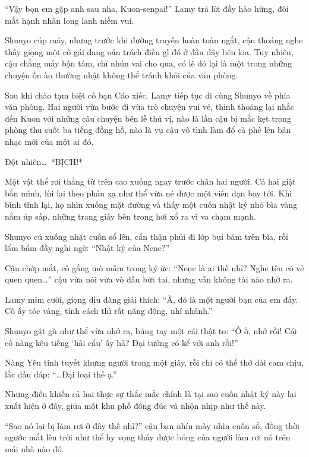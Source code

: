 \documentclass[../main.tex]{subfiles}
\begin{document}
``Vậy bọn em gặp anh sau nha, Kuon-senpai!'' Lamy trả lời đầy hào hứng, đôi mắt hạnh nhân long lanh niềm vui.

Shunyo cúp máy, nhưng trước khi đường truyền hoàn toàn ngắt, cậu thoáng nghe thấy giọng một cô gái đang oán trách điều gì đó ở đầu dây bên kia. Tuy nhiên, cậu chẳng mấy bận tâm, chỉ nhún vai cho qua, có lẽ đó lại là một trong những chuyện ồn ào thường nhật không thể tránh khỏi của văn phòng.

Sau khi chào tạm biệt cô bạn Cáo xiếc, Lamy tiếp tục đi cùng Shunyo về phía văn phòng. Hai người vừa bước đi vừa trò chuyện vui vẻ, thỉnh thoảng lại nhắc đến Kuon với những câu chuyện bên lề thú vị, nào là lần cậu bị mắc kẹt trong phòng thu suốt ba tiếng đồng hồ, nào là vụ cậu vô tình làm đổ cà phê lên bản nhạc mới của một ai đó.

Đột nhiên\dots\ *BỊCH!*

Một vật thể rơi thẳng từ trên cao xuống ngay trước chân hai người. Cả hai giật bắn mình, lùi lại theo phản xạ như thể vừa né được một viên đạn bay tới. Khi bình tĩnh lại, họ nhìn xuống mặt đường và thấy một cuốn nhật ký nhỏ bìa vàng nằm úp sấp, những trang giấy bên trong hơi xổ ra vì va chạm mạnh.


Shunyo cú xuống nhặt cuốn sổ lên, cẩn thận phủi đi lớp bụi bám trên bìa, rồi lẩm bẩm đầy nghi ngờ: ``Nhật ký của Nene?''

Cậu chớp mắt, cố gắng mò mẫm trong ký ức: ``Nene là ai thế nhỉ? Nghe tên có vẻ quen quen\dots'' cậu vừa nói vừa vò đầu bứt tai, nhưng vẫn không tài nào nhớ ra.

Lamy mỉm cười, giọng dịu dàng giải thích: ``À, đó là một người bạn của em đấy. Cô ấy tóc vàng, tính cách thì rất năng động, nhí nhảnh.''

Shunyo gật gù như thể vừa nhớ ra, búng tay một cái thật to: ``Ồ ồ, nhớ rồi! Cái cô nàng kêu tiếng `hải cẩu' ấy hả? Đại tướng có kể với anh rồi!''

Nàng Yêu tinh tuyết khựng người trong một giây, rồi chỉ có thể thở dài cam chịu, lắc đầu đáp: ``\dots Đại loại thế ạ.''

Nhưng điều khiến cả hai thực sự thắc mắc chính là tại sao cuốn nhật ký này lại xuất hiện ở đây, giữa một khu phố đông đúc và nhộn nhịp như thế này.

``Sao nó lại bị làm rơi ở đây thế nhỉ?'' cậu bạn nhíu mày nhìn cuốn sổ, đồng thời ngước mắt lên trời như thể hy vọng thấy được bóng của người làm rơi nó trên mái nhà nào đó.
\end{document}
